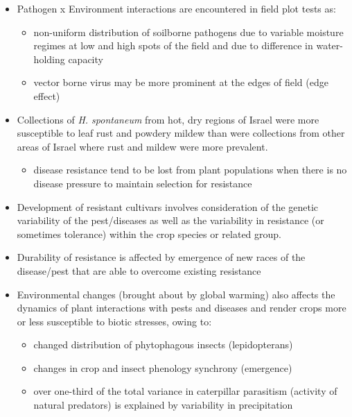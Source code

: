 \documentclass[11pt,dvipsnames,ignorenonframetext,aspectratio=169]{beamer}
\providecommand{\tightlist}{%
  \setlength{\itemsep}{0pt}\setlength{\parskip}{0pt}}
\begin{document}
\begin{frame}{}
\protect\hypertarget{section-7}{}
\begin{itemize}
\tightlist
\item
  Pathogen x Environment interactions are encountered in field plot
  tests as:

  \begin{itemize}
  \tightlist
  \item
    non-uniform distribution of soilborne pathogens due to variable
    moisture regimes at low and high spots of the field and due to
    difference in water-holding capacity
  \item
    vector borne virus may be more prominent at the edges of field (edge
    effect)
  \end{itemize}
\item
  Collections of \textit{H. spontaneum} from hot, dry regions of Israel
  were more susceptible to leaf rust and powdery mildew than were
  collections from other areas of Israel where rust and mildew were more
  prevalent.

  \begin{itemize}
  \tightlist
  \item
    disease resistance tend to be lost from plant populations when there
    is no disease pressure to maintain selection for resistance
  \end{itemize}
\end{itemize}
\end{frame}

\begin{frame}{}
\protect\hypertarget{section-8}{}
\begin{itemize}
\tightlist
\item
  Development of resistant cultivars involves consideration of the
  genetic variability of the pest/diseases as well as the variability in
  resistance (or sometimes tolerance) within the crop species or related
  group.
\item
  Durability of resistance is affected by emergence of new races of the
  disease/pest that are able to overcome existing resistance
\item
  Environmental changes (brought about by global warming) also affects
  the dynamics of plant interactions with pests and diseases and render
  crops more or less susceptible to biotic stresses, owing to:

  \begin{itemize}
  \tightlist
  \item
    changed distribution of phytophagous insects (lepidopterans)
  \item
    changes in crop and insect phenology synchrony (emergence)
  \item
    over one-third of the total variance in caterpillar parasitism
    (activity of natural predators) is explained by variability in
    precipitation
  \end{itemize}
\end{itemize}
\end{frame}
\end{document}
